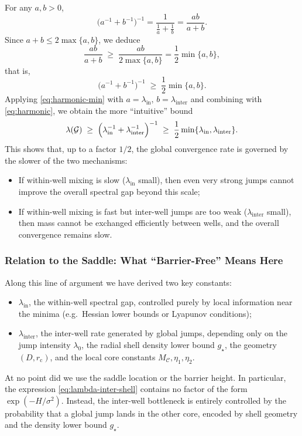 For any \(a,b>0\),
\begin{equation}\label{eq:harmonic-vs-min}
\bigl(a^{-1}+b^{-1}\bigr)^{-1}
=
\frac{1}{\frac{1}{a}+\frac{1}{b}}
=
\frac{ab}{a+b}.
\end{equation}
Since
\(
a+b\le 2\max\{a,b\}
\),
we deduce
\[
\frac{ab}{a+b}
\;\ge\;
\frac{ab}{2\max\{a,b\}}
=
\frac12\min\{a,b\},
\]
that is,
\begin{equation}\label{eq:harmonic-min}
\bigl(a^{-1}+b^{-1}\bigr)^{-1}
\;\ge\;
\frac12\min\{a,b\}.
\end{equation}
Applying \eqref{eq:harmonic-min} with
\(a=\lambda_{\mathrm{in}},\,b=\lambda_{\mathrm{inter}}\)
and combining with \eqref{eq:harmonic}, we obtain the more “intuitive” bound
\begin{equation}\label{eq:min-form}
\lambda(\mathcal G)
\;\ge\;
\Bigl(\lambda_{\mathrm{in}}^{-1}+\lambda_{\mathrm{inter}}^{-1}\Bigr)^{-1}
\;\ge\;
\frac12\min\{\lambda_{\mathrm{in}},\lambda_{\mathrm{inter}}\}.
\end{equation}
This shows that, up to a factor \(1/2\), the global convergence rate is governed
by the slower of the two mechanisms:
\begin{itemize}
  \item If within-well mixing is slow (\(\lambda_{\mathrm{in}}\) small), then even
  very strong jumps cannot improve the overall spectral gap beyond this scale;
  \item If within-well mixing is fast but inter-well jumps are too weak
  (\(\lambda_{\mathrm{inter}}\) small), then mass cannot be exchanged efficiently
  between wells, and the overall convergence remains slow.
\end{itemize}

\subsubsection{Relation to the Saddle: What “Barrier-Free” Means Here}

Along this line of argument we have derived two key constants:
\begin{itemize}
  \item \(\lambda_{\mathrm{in}}\), the within-well spectral gap, controlled purely
  by local information near the minima (e.g.\ Hessian lower bounds or
  Lyapunov conditions);
  \item \(\lambda_{\mathrm{inter}}\), the inter-well rate generated by global jumps,
  depending only on the jump intensity \(\lambda_0\), the radial shell density
  lower bound \(g_\star\), the geometry \((D,r_{\mathrm c})\), and the local
  core constants \(M_{\mathcal C},\eta_1,\eta_2\).
\end{itemize}
At no point did we use the saddle location or the barrier height.
In particular, the expression \eqref{eq:lambda-inter-shell} contains no factor
of the form \(\exp(-H/\sigma^2)\).
Instead, the inter-well bottleneck is entirely controlled by the probability
that a global jump lands in the other core, encoded by shell geometry and
the density lower bound \(g_\star\).

